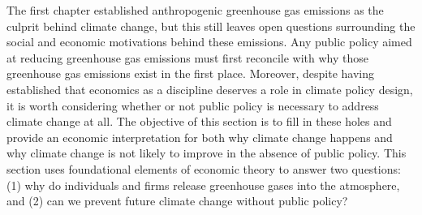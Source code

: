 
The first chapter established anthropogenic greenhouse gas emissions as the culprit behind climate change, but this still leaves open questions surrounding the social and economic motivations behind these emissions. Any public policy aimed at reducing greenhouse gas emissions must first reconcile with why those greenhouse gas emissions exist in the first place. Moreover, despite having established that economics as a discipline deserves a role in climate policy design, it is worth considering whether or not public policy is necessary to address climate change at all. The objective of this section is to fill in these holes and provide an economic interpretation for both why climate change happens and why climate change is not likely to improve in the absence of public policy. This section uses foundational elements of economic theory to answer two questions: (1) why do individuals and firms release greenhouse gases into the atmosphere, and (2) can we prevent future climate change without public policy? 

